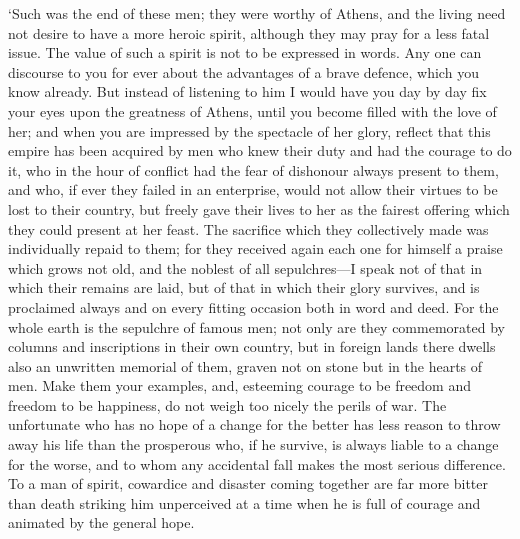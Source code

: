 `Such was the end of these men; they were worthy of Athens, and the
living need not desire to have a more heroic spirit, although they may
pray for a less fatal issue. The value of such a spirit is not to be
expressed in words. Any one can discourse to you for ever about the
advantages of a brave defence, which you know already. But instead of
listening to him I would have you day by day fix your eyes upon the
greatness of Athens, until you become filled with the love of her; and
when you are impressed by the spectacle of her glory, reflect that
this empire has been acquired by men who knew their duty and had the
courage to do it, who in the hour of conflict had the fear of
dishonour always present to them, and who, if ever they failed in an
enterprise, would not allow their virtues to be lost to their country,
but freely gave their lives to her as the fairest offering which they
could present at her feast. The sacrifice which they collectively made
was individually repaid to them; for they received again each one for
himself a praise which grows not old, and the noblest of all
sepulchres---I speak not of that in which their remains are laid, but
of that in which their glory survives, and is proclaimed always and on
every  fitting occasion both in word and deed. For the whole
earth is the sepulchre of famous men; not only are they commemorated
by columns and inscriptions in their own country, but in foreign lands
there dwells also an unwritten memorial of them, graven not on stone
but in the hearts of men. Make them your examples, and, esteeming
courage to be freedom and freedom to be happiness, do not weigh too
nicely the perils of war. The unfortunate who has no hope of a change
for the better has less reason to throw away his life than the
prosperous who, if he survive, is always liable to a change for the
worse, and to whom any accidental fall makes the most serious
difference. To a man of spirit, cowardice and disaster coming together
are far more bitter than death striking him unperceived at a time when
he is full of courage and animated by the general hope.

